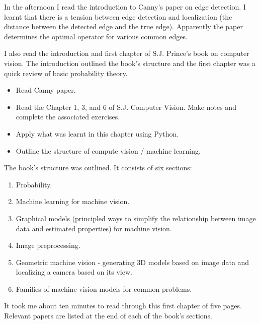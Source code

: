 \documentclass[idxtotoc,hyperref,openany]{labbook} %
\begin{document}
In the afternoon I read the introduction to Canny's paper on edge detection. I learnt that there is a tension between edge detection and localization (the distance between the detected edge and the true edge). Apparently the paper determines the optimal operator for various common edges.

I also read the introduction and first chapter of S.J. Prince's book on computer vision. The introduction outlined the book's structure and the first chapter was a quick review of basic probability theory.

\begin{itemize}
\item Read Canny paper.
\item Read the Chapter 1, 3, and 6 of S.J. Computer Vision. Make notes and complete the associated exercises.
\item Apply what was learnt in this chapter using Python.
\item Outline the structure of compute vision / machine learning.
\end{itemize}

The book's structure was outlined. It consists of six sections:
\begin{enumerate}
\item Probability.
\item Machine learning for machine vision.
\item Graphical models (principled ways to simplify the relationship between image data and estimated properties) for machine vision.
\item Image preprocessing.
\item Geometric machine vision - generating 3D models based on image data and localizing a camera based on its view.
\item Families of machine vision models for common problems.
\end{enumerate}
It took me about ten minutes to read through this first chapter of five pages. Relevant papers are listed at the end of each of the book's sections.
\end{document}
